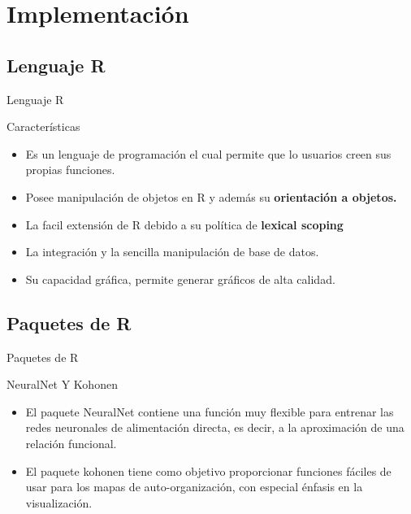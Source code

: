 \documentclass{beamer}
\begin{document}
\section{Implementación}
\subsection{Lenguaje R}
\begin{frame}{Lenguaje R}
\begin{block}{Características}
\begin{itemize}
\item Es un lenguaje de programación el cual permite que lo usuarios creen sus propias funciones.\pause
\item Posee manipulación de objetos en R y además su \textbf{orientación a objetos.}\pause
\item La facil extensión de R debido a su política de \textbf{lexical scoping}\pause
\item La integración y la sencilla manipulación de base de datos.\pause
\item Su capacidad gráfica, permite generar gráficos de alta calidad.\\
\end{itemize}
\end{block}
\end{frame}

\subsection{Paquetes de R}
\begin{frame}{Paquetes de R}
\begin{block}{NeuralNet Y Kohonen}
\begin{itemize}
\item El paquete NeuralNet contiene una función muy flexible para entrenar las redes neuronales de alimentación directa, es decir, a la aproximación de una relación funcional.\pause

\item El paquete kohonen tiene como objetivo proporcionar funciones fáciles de usar para los mapas de auto-organización, con especial énfasis en la visualización.
\end{itemize}
\end{block}
\end{frame}
\end{document}
